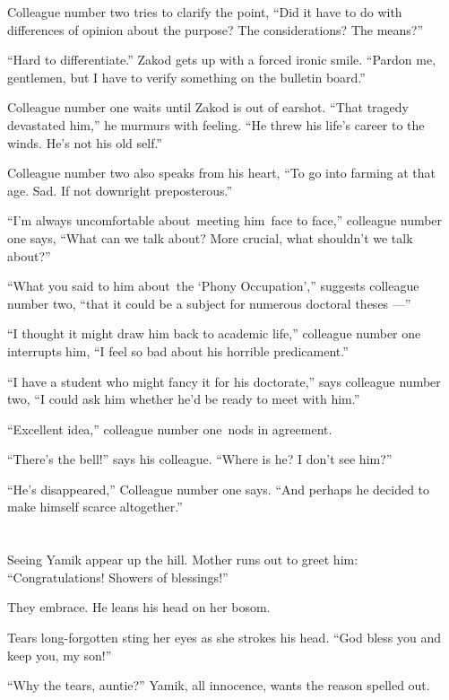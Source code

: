 \documentclass[twoside,11pt,openany]{book}
\begin{document}
Colleague number two tries to clarify the point, ``Did it have to do with differences of opinion about the
purpose? The considerations? The means?''

``Hard to differentiate.'' Zakod gets up with a forced ironic smile. ``Pardon me,
gentlemen, but I have to verify something on the bulletin board.''

Colleague number one waits until Zakod is out of earshot. ``That tragedy devastated him,'' he
murmurs with feeling. ``He threw his life's career to the winds.  He's not his old self.''

Colleague number two also speaks from his heart, ``To go into farming at that age. Sad. If not downright
preposterous.''

{}``I'm always uncomfortable about~meeting him~face to face,'' colleague number one says, ``What can we talk about? More
crucial, what shouldn't we talk about?''

``What you said to him about~the `Phony Occupation',{}'' suggests colleague number two, ``that it could be
a subject for numerous doctoral theses ---''

``I thought it might draw him back to academic life,'' colleague number one interrupts him, ``I feel so bad
about his horrible predicament.''

``I have a student who might fancy it for his doctorate,'' says colleague number two, ``I could ask him
whether he'd be ready to meet with him.''

``Excellent idea,'' colleague number one~nods in agreement.

``There's the bell!'' says his colleague. ``Where is he? I don't see him?''

{}``He's disappeared,'' Colleague number one says. ``And perhaps he decided to make himself
scarce altogether.''


\bigskip

\chapter{}

Seeing Yamik appear up the hill. Mother runs out to greet him: ``Congratulations! Showers of
blessings!''

They embrace. He leans his head on her bosom.

Tears long-forgotten sting her eyes as she strokes his head.  ``God bless you and keep you, my son!''

``Why the tears, auntie?'' Yamik, all innocence, wants the reason spelled out.
\end{document}
